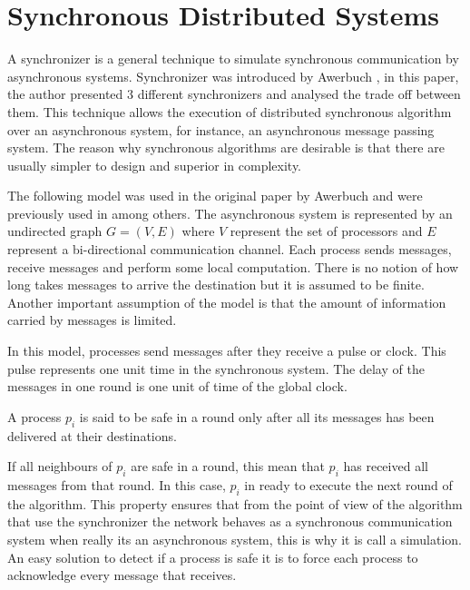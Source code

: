 \section{Synchronous Distributed Systems}
\label{chap:3}

A synchronizer is a general technique to simulate synchronous communication by asynchronous systems. Synchronizer was introduced by Awerbuch \cite{awerbuch1985complexity}, in this paper, the author presented 3 different synchronizers and analysed the trade off between them. This technique allows the execution of distributed synchronous algorithm over an asynchronous system, for instance, an asynchronous message passing system. The reason why synchronous algorithms are desirable is that there are usually simpler to design and superior in complexity. 


The following model was used in the original paper by Awerbuch \cite{awerbuch1985complexity} and were previously used in \cite{segall1983distributed,gallager1982distributed} among others. The asynchronous system is represented by an undirected graph $G = (V,E)$ where $V$ represent the set of processors and $E$ represent a bi-directional communication channel. Each process sends messages, receive messages and perform some local computation. There is no notion of how long takes messages to arrive the destination but it is assumed to be finite. Another important assumption of the model is that the amount of information carried by messages is limited.

In this model, processes send messages after they receive a pulse or clock. This pulse represents one unit time in the synchronous system. The delay of the messages in one round is one unit of time of the global clock.

\begin{definition}
\label{def:safe}
A process $p_i$ is said to be safe in a round only after all its messages has been delivered at their destinations.
\end{definition}

If all neighbours of $p_i$ are safe in a round, this mean that $p_i$ has received all messages from that round. In this case, $p_i$ in ready to execute the next round of the algorithm. This property ensures that from the point of view of the algorithm that use the synchronizer the network behaves as a synchronous communication system when really its an asynchronous system, this is why it is call a simulation. An easy solution to detect if a process is safe it is to force each process to acknowledge every message that receives. 

